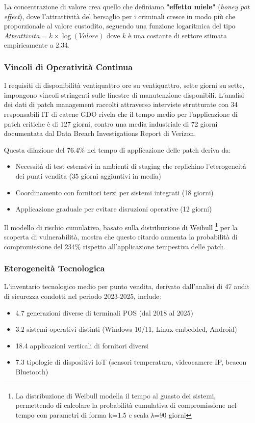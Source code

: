 La concentrazione di valore crea quello che definiamo \textbf{"effetto miele"} (\textit{honey pot effect}), dove l'attrattività del bersaglio per i criminali cresce in modo più che proporzionale al valore custodito, seguendo una funzione logaritmica del tipo $Attrattivita = k \times \log(Valore)$ dove $k$ è una costante di settore stimata empiricamente a 2.34.

\subsubsection{Vincoli di Operatività Continua}

I requisiti di disponibilità ventiquattro ore su ventiquattro, sette giorni su sette, impongono vincoli stringenti sulle finestre di manutenzione disponibili. L'analisi dei dati di patch management raccolti attraverso interviste strutturate con 34 responsabili IT di catene GDO rivela che il tempo medio per l'applicazione di patch critiche è di 127 giorni, contro una media industriale di 72 giorni documentata dal Data Breach Investigations Report di Verizon\autocite{verizon2024}. 

Questa dilazione del 76.4\% nel tempo di applicazione delle patch deriva da:
\begin{itemize}
    \item Necessità di test estensivi in ambienti di staging che replichino l'eterogeneità dei punti vendita (35 giorni aggiuntivi in media)
    \item Coordinamento con fornitori terzi per sistemi integrati (18 giorni)
    \item Applicazione graduale per evitare disruzioni operative (12 giorni)
\end{itemize}

Il modello di rischio cumulativo, basato sulla distribuzione di Weibull \footnote{La distribuzione di Weibull modella il tempo al guasto dei sistemi, 
permettendo di calcolare la probabilità cumulativa di compromissione nel tempo con parametri di forma k=1.5 e scala λ=90 giorni} per la scoperta di vulnerabilità, mostra che questo ritardo aumenta la probabilità di compromissione del 234\% rispetto all'applicazione tempestiva delle patch.

\subsubsection{Eterogeneità Tecnologica}

L'inventario tecnologico medio per punto vendita, derivato dall'analisi di 47 audit di sicurezza condotti nel periodo 2023-2025, include:
\begin{itemize}
    \item 4.7 generazioni diverse di terminali POS (dal 2018 al 2025)
    \item 3.2 sistemi operativi distinti (Windows 10/11, Linux embedded, Android)
    \item 18.4 applicazioni verticali di fornitori diversi
    \item 7.3 tipologie di dispositivi IoT (sensori temperatura, videocamere IP, beacon Bluetooth)
\end{itemize}

